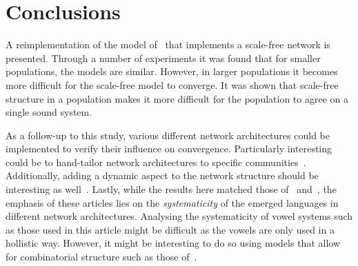 \documentclass[11pt]{article}
\begin{document}
\section{Conclusions\label{sec:conclusion}}
A reimplementation of the model of~ that implements a scale-free network is presented.
Through a number of experiments it was found that for smaller populations, the models are similar. However, in larger populations it becomes more
difficult for the scale-free model to converge. It was shown that scale-free structure in a population makes it more difficult for the population to agree on a single sound system.

As a follow-up to this study, various different network architectures could be implemented to verify their influence on convergence. Particularly interesting could be to hand-tailor
network architectures to specific communities~. Additionally, adding a dynamic aspect to the network structure should be interesting as
well~.
Lastly, while the results here matched those of~ and~, the emphasis of these articles lies on the
\textit{systematicity} of the emerged languages in different network architectures. Analysing the systematicity of vowel systems such as those used in this article might be difficult as the vowels
are
only used in a hollistic way. However, it might be interesting to do so using models that allow for combinatorial structure such as those of~.


\end{document}
